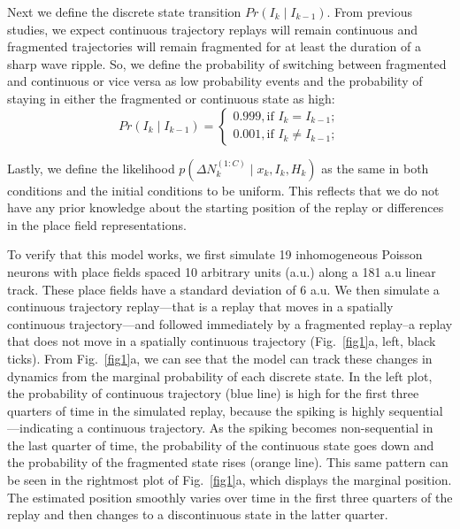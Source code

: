 \documentclass[conference]{IEEEtran}
\begin{document}
Next we define the discrete state transition $Pr(I_{k} \mid I_{k-1})$. From previous studies, we expect continuous trajectory replays will remain continuous and fragmented trajectories will remain fragmented for at least the duration of a sharp wave ripple. So, we define the probability of switching between fragmented and continuous or vice versa as low probability events and the probability of staying in either the fragmented or continuous state as high:
\begin{equation}
    Pr(I_{k} \mid I_{k-1}) = \begin{cases}
    0.999, \text{if } I_{k} = I_{k-1}; \\
    0.001, \text{if } I_{k} \ne I_{k-1};
    \end{cases}
\end{equation}{}

Lastly, we define the likelihood $p(\Delta N_{k}^{(1:C)} \mid x_{k}, I_{k}, H_{k})$ as the same in both conditions and the initial conditions to be uniform. This reflects that we do not have any prior knowledge about the starting position of the replay or differences in the place field representations.

To verify that this model works, we first simulate 19 inhomogeneous Poisson neurons with place fields spaced 10 arbitrary units (a.u.) along a 181 a.u linear track. These place fields have a standard deviation of 6 a.u. We then simulate a continuous trajectory replay---that is a replay that moves in a spatially continuous trajectory---and followed immediately by a fragmented replay--a replay that does not move in a spatially continuous trajectory (Fig.~\ref{fig1}a, left, black ticks). From Fig.~\ref{fig1}a, we can see that the model can track these changes in dynamics from the marginal probability of each discrete state. In the left plot, the probability of continuous trajectory (blue line) is high for the first three quarters of time in the simulated replay, because the spiking is highly sequential---indicating a continuous trajectory. As the spiking becomes non-sequential in the last quarter of time, the probability of the continuous state goes down and the probability of the fragmented state rises (orange line). This same pattern can be seen in the rightmost plot of Fig.~\ref{fig1}a, which displays the marginal position. The estimated position smoothly varies over time in the first three quarters of the replay and then changes to a discontinuous state in the latter quarter.
\end{document}
